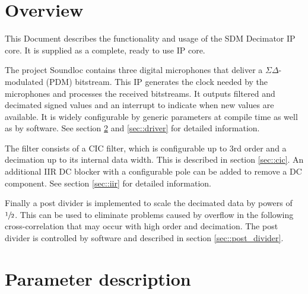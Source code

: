 


\maketitle


\section{Overview}
\label{sec:overview}

This Document describes the functionality and usage of the SDM Decimator IP core.
It is supplied as a complete, ready to use IP core.

The project Soundloc contains three digital microphones that deliver a $\Sigma\Delta$-modulated (PDM) bitstream.
This IP generates the clock needed by the microphones and processes the received bitstreams.
It outputs filtered and decimated signed values and an interrupt to indicate when new values are available.
It is widely configurable by generic parameters at compile time as well as by software.
See section \ref{sec::parameters} and \ref{sec::driver} for detailed information.

The filter consists of a CIC filter, which is configurable up to 3rd order and a decimation up to its internal data width.
This is described in section \ref{sec::cic}.
An additional IIR DC blocker with a configurable pole can be added to remove a DC component. 
See section \ref{sec::iir} for detailed information.

Finally a post divider is implemented to scale the decimated data by powers of $\sfrac{1}{2}$.
This can be used to eliminate problems caused by overflow in the following cross-correlation that may occur with high order and decimation.
The post divider is controlled by software and described in section \ref{sec::post_divider}.

\section{Parameter description}
\label{sec::parameters}

